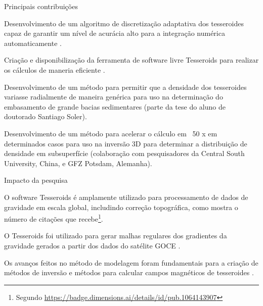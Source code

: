 \documentclass[10pt,a4paper,oneside]{book}
\begin{document}
\begin{fancyenum}{\faLightbulb}{Principais contribuições}
  \item Desenvolvimento de um algoritmo de discretização adaptativa dos
    tesseroides capaz de garantir um nível de acurácia alto para a integração
    numérica automaticamente \citep{Uieda2016}.
  \item Criação e disponibilização da ferramenta de software livre Tesseroids
    para realizar os cálculos de maneria eficiente \citep{Uieda2016}.
  \item Desenvolvimento de um método para permitir que a densidade dos
    tesseroides variasse radialmente de maneira genérica \citep{Soler2019}
    para uso na determinação do embasamento de grande bacias sedimentares
    (parte da tese do aluno de doutorado Santiago Soler).
  \item Desenvolvimento de um método para acelerar o cálculo
    em ~50 x em determinados casos para uso na inversão 3D para determinar a
    distribuição de densidade em subsuperfície \citep{Zhao2019}
    (colaboração com pesquisadores da Central South University, China, e GFZ
    Potsdam, Alemanha).
\end{fancyenum}

\begin{fancyenum}{\faRocket}{Impacto da pesquisa}
  \item O software Tesseroids é amplamente utilizado para processamento de
    dados de gravidade em escala global, includindo correção topográfica, como
    mostra o número de citações que recebe\footnote{Segundo
    \url{https://badge.dimensions.ai/details/id/pub.1064143907}}.
  \item O Tesseroids foi utilizado para gerar malhas regulares dos gradientes da
    gravidade gerados a partir dos dados do satélite GOCE \citep{Bouman2016}.
  \item Os avanços feitos no método de modelagem foram fundamentais para a
    criação de métodos de inversão \citep{Uieda2017,Zhao2019} e métodos para
    calcular campos magnéticos de tesseroides \citep{Baykiev2016}.
\end{fancyenum}
\end{document}

